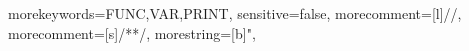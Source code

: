   {morekeywords={FUNC,VAR,PRINT},
  sensitive=false,
  morecomment=[l]{//},
  morecomment=[s]{/*}{*/},
  morestring=[b]",
}
